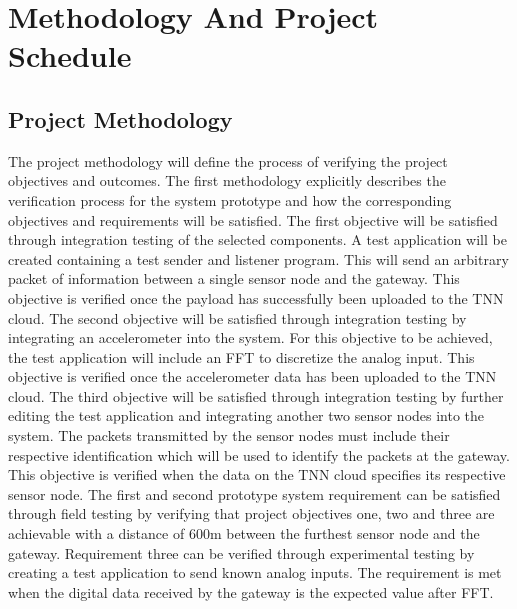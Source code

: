 \section{Methodology And Project Schedule}
\subsection{Project Methodology}

The project methodology will define the process of verifying the project objectives and outcomes. The first methodology explicitly describes the verification process for the system prototype and how the corresponding objectives and requirements will be satisfied. The first objective will be satisfied through integration testing of the selected components. A test application will be created containing a test sender and listener program. This will send an arbitrary packet of information between a single sensor node and the gateway. This objective is verified once the payload has successfully been uploaded to the TNN cloud. The second objective will be satisfied through integration testing by integrating an accelerometer into the system. For this objective to be achieved, the test application will include an FFT to discretize the analog input. This objective is verified once the accelerometer data has been uploaded to the TNN cloud. The third objective will be satisfied through integration testing by further editing the test application and integrating another two sensor nodes into the system. The packets transmitted by the sensor nodes must include their respective identification which will be used to identify the packets at the gateway. This objective is verified when the data on the TNN cloud specifies its respective sensor node. The first and second prototype system requirement can be satisfied through field testing by verifying that project objectives one, two and three are achievable with a distance of 600m between the furthest sensor node and the gateway. Requirement three can be verified through experimental testing by creating a test application to send known analog inputs. The requirement is met when the digital data received by the gateway is the expected value after FFT.\\\\

